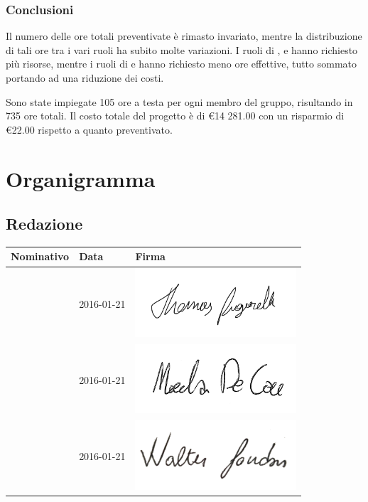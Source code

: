 \documentclass[12pt,a4paper]{article}
\begin{document}
\subsubsection{Conclusioni}

\par Il numero delle ore totali preventivate è rimasto invariato, mentre la distribuzione di tali ore tra i vari ruoli ha subito molte variazioni. I ruoli di \AN{}, \PR{} e \VR{} hanno richiesto più risorse, mentre i ruoli di \AM{} e \PG{} hanno richiesto meno ore effettive, tutto sommato portando ad una riduzione dei costi.

\par Sono state impiegate 105 ore a testa per ogni membro del gruppo, risultando in 735 ore totali. Il costo totale del progetto è di \euro{}14 281.00 con un risparmio di \euro{}22.00 rispetto a quanto preventivato. 

\appendix
\section{Organigramma}

\subsection{Redazione}

\begin{table}[H]
	\begin{center}
		\begin{tabular}{l l l}
			\toprule
            \textbf{Nominativo}	& \textbf{Data} & \textbf{Firma} \\ \midrule
			\midrule
            \TP{} & 2016-01-21 & \includegraphics[width=6cm]{../img/firmaPigarelli.png} \\ \midrule
            \NDC{} & 2016-01-21 & \includegraphics[width=6cm]{../img/firmaDeCao.png} \\ \midrule
			\WS{} & 2016-01-21 & \includegraphics[width=6cm]{../img/firmaSandon.png} \\
			\bottomrule
		\end{tabular}
	\end{center}
\end{table}
\end{document}
